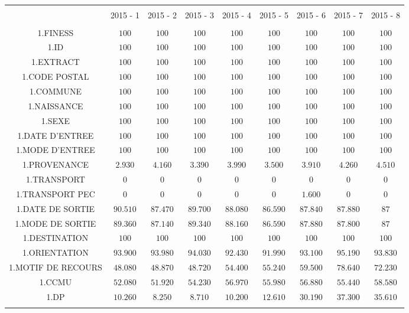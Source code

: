 \documentclass[]{article}
\begin{document}
\begin{table}[!htbp] \centering 
  \caption{} 
  \label{} 
\begin{tabular}{@{\extracolsep{5pt}} ccccccccc} 
\\[-1.8ex]\hline 
\hline \\[-1.8ex] 
 & 2015 - 1 & 2015 - 2 & 2015 - 3 & 2015 - 4 & 2015 - 5 & 2015 - 6 & 2015 - 7 & 2015 - 8 \\ 
\hline \\[-1.8ex] 
1.FINESS & $100$ & $100$ & $100$ & $100$ & $100$ & $100$ & $100$ & $100$ \\ 
1.ID & $100$ & $100$ & $100$ & $100$ & $100$ & $100$ & $100$ & $100$ \\ 
1.EXTRACT & $100$ & $100$ & $100$ & $100$ & $100$ & $100$ & $100$ & $100$ \\ 
1.CODE POSTAL & $100$ & $100$ & $100$ & $100$ & $100$ & $100$ & $100$ & $100$ \\ 
1.COMMUNE & $100$ & $100$ & $100$ & $100$ & $100$ & $100$ & $100$ & $100$ \\ 
1.NAISSANCE & $100$ & $100$ & $100$ & $100$ & $100$ & $100$ & $100$ & $100$ \\ 
1.SEXE & $100$ & $100$ & $100$ & $100$ & $100$ & $100$ & $100$ & $100$ \\ 
1.DATE D'ENTREE & $100$ & $100$ & $100$ & $100$ & $100$ & $100$ & $100$ & $100$ \\ 
1.MODE D'ENTREE & $100$ & $100$ & $100$ & $100$ & $100$ & $100$ & $100$ & $100$ \\ 
1.PROVENANCE & $2.930$ & $4.160$ & $3.390$ & $3.990$ & $3.500$ & $3.910$ & $4.260$ & $4.510$ \\ 
1.TRANSPORT & $0$ & $0$ & $0$ & $0$ & $0$ & $0$ & $0$ & $0$ \\ 
1.TRANSPORT PEC & $0$ & $0$ & $0$ & $0$ & $0$ & $1.600$ & $0$ & $0$ \\ 
1.DATE DE SORTIE & $90.510$ & $87.470$ & $89.700$ & $88.080$ & $86.590$ & $87.840$ & $87.880$ & $87$ \\ 
1.MODE DE SORTIE & $89.360$ & $87.140$ & $89.340$ & $88.160$ & $86.590$ & $87.880$ & $87.800$ & $87$ \\ 
1.DESTINATION & $100$ & $100$ & $100$ & $100$ & $100$ & $100$ & $100$ & $100$ \\ 
1.ORIENTATION & $93.900$ & $93.980$ & $94.030$ & $92.430$ & $91.990$ & $93.100$ & $95.190$ & $93.830$ \\ 
1.MOTIF DE RECOURS & $48.080$ & $48.870$ & $48.720$ & $54.400$ & $55.240$ & $59.500$ & $78.640$ & $72.230$ \\ 
1.CCMU & $52.080$ & $51.920$ & $54.230$ & $56.970$ & $55.980$ & $56.880$ & $55.440$ & $58.580$ \\ 
1.DP & $10.260$ & $8.250$ & $8.710$ & $10.200$ & $12.610$ & $30.190$ & $37.300$ & $35.610$ \\ 
\hline \\[-1.8ex] 
\end{tabular} 
\end{table}
\end{document}
